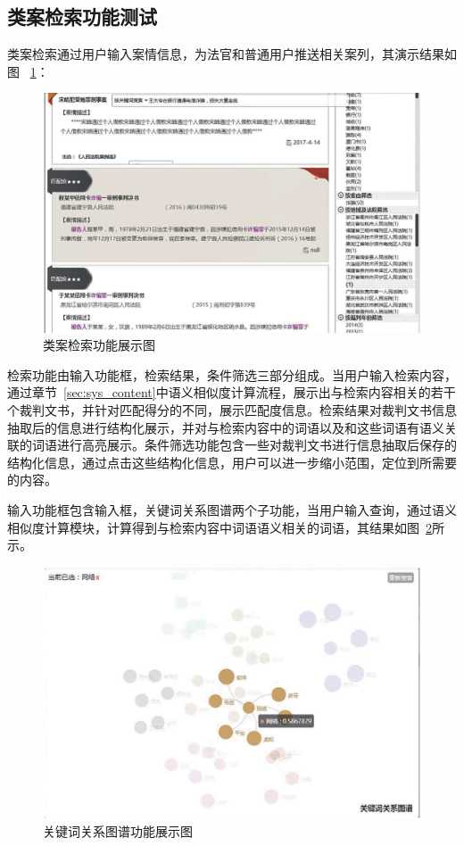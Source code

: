 \subsection{类案检索功能测试}
类案检索通过用户输入案情信息，为法官和普通用户推送相关案列，其演示结果如图
~\ref{fig:sys_search}：
\begin{figure}[htbp]%
    \centering
    \includegraphics[scale=0.4, clip=true]{./sources/sys_search.eps}
    \caption{\label{fig:sys_search}类案检索功能展示图}
\end{figure}

检索功能由输入功能框，检索结果，条件筛选三部分组成。当用户输入检索内容，通过章节~\ref{sec:sys_content}中语义相似度计算流程，展示出与检索内容相关的若干个裁判文书，并针对匹配得分的不同，展示匹配度信息。检索结果对裁判文书信息抽取后的信息进行结构化展示，并对与检索内容中的词语以及和这些词语有语义关联的词语进行高亮展示。条件筛选功能包含一些对裁判文书进行信息抽取后保存的结构化信息，通过点击这些结构化信息，用户可以进一步缩小范围，定位到所需要的内容。

输入功能框包含输入框，关键词关系图谱两个子功能，当用户输入查询，通过语义相似度计算模块，计算得到与检索内容中词语语义相关的词语，其结果如图~\ref{fig:sys_word}所示。
\begin{figure}[htbp]%
    \centering
    \includegraphics[scale=0.4, clip=true]{./sources/sys_word.eps}
    \caption{\label{fig:sys_word}关键词关系图谱功能展示图}
\end{figure}

